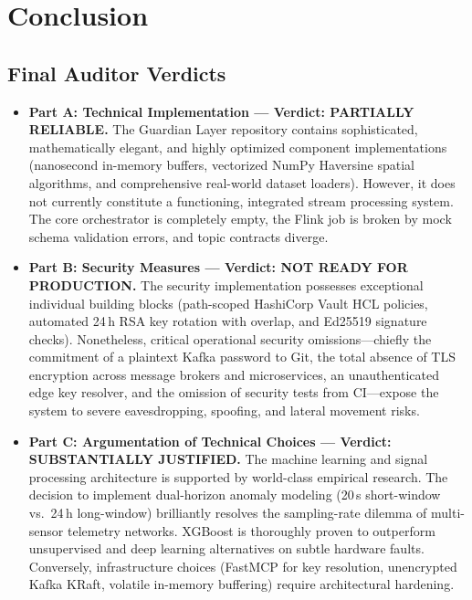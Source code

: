 \documentclass[10pt,a4paper]{report}
\begin{document}
\chapter{Conclusion}

\section{Final Auditor Verdicts}
\begin{itemize}[leftmargin=*]
  \item \textbf{Part A: Technical Implementation --- Verdict: PARTIALLY RELIABLE.}
  The Guardian Layer repository contains sophisticated, mathematically elegant, and highly optimized component implementations (nanosecond in-memory buffers, vectorized NumPy Haversine spatial algorithms, and comprehensive real-world dataset loaders). However, it does not currently constitute a functioning, integrated stream processing system. The core orchestrator is completely empty, the Flink job is broken by mock schema validation errors, and topic contracts diverge.
  \item \textbf{Part B: Security Measures --- Verdict: NOT READY FOR PRODUCTION.}
  The security implementation possesses exceptional individual building blocks (path-scoped HashiCorp Vault HCL policies, automated 24\,h RSA key rotation with overlap, and Ed25519 signature checks). Nonetheless, critical operational security omissions---chiefly the commitment of a plaintext Kafka password to Git, the total absence of TLS encryption across message brokers and microservices, an unauthenticated edge key resolver, and the omission of security tests from CI---expose the system to severe eavesdropping, spoofing, and lateral movement risks.
  \item \textbf{Part C: Argumentation of Technical Choices --- Verdict: SUBSTANTIALLY JUSTIFIED.}
  The machine learning and signal processing architecture is supported by world-class empirical research. The decision to implement dual-horizon anomaly modeling (20\,s short-window vs.\ 24\,h long-window) brilliantly resolves the sampling-rate dilemma of multi-sensor telemetry networks. XGBoost is thoroughly proven to outperform unsupervised and deep learning alternatives on subtle hardware faults. Conversely, infrastructure choices (FastMCP for key resolution, unencrypted Kafka KRaft, volatile in-memory buffering) require architectural hardening.
\end{itemize}
\end{document}
